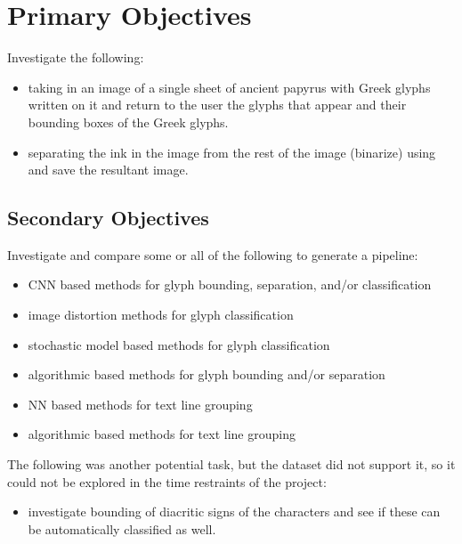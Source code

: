 \section{Primary Objectives}

Investigate the following:

\begin{itemize}
  \item taking in an image of a single sheet of ancient papyrus with Greek glyphs written on it and return to the user the glyphs that appear and their bounding boxes of the Greek glyphs.
  \item separating the ink in the image from the rest of the image (binarize) using and save the resultant image.
\end{itemize}

\subsection{Secondary Objectives}

Investigate and compare some or all of the following to generate a pipeline:

\begin{itemize}
  \item CNN based methods for glyph bounding, separation, and/or classification
  \item image distortion methods for glyph classification
  \item stochastic model based methods for glyph classification
  \item algorithmic based methods for glyph bounding and/or separation
  \item NN based methods for text line grouping
  \item algorithmic based methods for text line grouping
\end{itemize}

The following was another potential task, but the dataset did not support it, so it could not be explored in the time restraints of the project:

\begin{itemize}
  \item investigate bounding of diacritic signs of the characters and see if these can be automatically classified as well.
\end{itemize}
